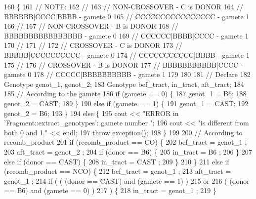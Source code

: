 \begin{DoxyCode}
160 \{
161     \textcolor{comment}{// NOTE: }
162     \textcolor{comment}{//}
163     \textcolor{comment}{// NON-CROSSOVER - C is DONOR}
164     \textcolor{comment}{// BBBBBB|CCCC|BBBB - gamete 0}
165     \textcolor{comment}{// CCCCCCCCCCCCCCCC - gamete 1}
166     \textcolor{comment}{//}
167     \textcolor{comment}{// NON-CROSSOVER - B is DONOR}
168     \textcolor{comment}{// BBBBBBBBBBBBBBBB - gamete 0}
169     \textcolor{comment}{// CCCCCC|BBBB|CCCC - gamete 1}
170     \textcolor{comment}{//}
171     \textcolor{comment}{//}
172     \textcolor{comment}{// CROSSOVER - C is DONOR}
173     \textcolor{comment}{// BBBBB|CCCCCCCCCC - gamete 0}
174     \textcolor{comment}{// CCCCCCCCCCC|BBBB - gamete 1}
175     \textcolor{comment}{//}
176     \textcolor{comment}{// CROSSOVER - B is DONOR}
177     \textcolor{comment}{// BBBBBBBBBBB|CCCC - gamete 0}
178     \textcolor{comment}{// CCCCC|BBBBBBBBBB - gamete 1}
179     
180     
181     \textcolor{comment}{// Declare}
182     Genotype genot\_1, genot\_2;
183     Genotype bef\_tract, in\_tract, aft\_tract;
184 
185     \textcolor{comment}{// According to the gamete}
186     \textcolor{keywordflow}{if} (gamete == 0) \{
187         genot\_1 = B6;
188         genot\_2 = CAST;
189     \}
190     \textcolor{keywordflow}{else} \textcolor{keywordflow}{if} (gamete == 1) \{
191         genot\_1 = CAST;
192         genot\_2 = B6;
193     \}
194     \textcolor{keywordflow}{else} \{
195         cout << \textcolor{stringliteral}{"ERROR in 'Fragment::extract\_genotypes': gamete number "};
196         cout << \textcolor{stringliteral}{"is different from both 0 and 1."} << endl;
197         \textcolor{keywordflow}{throw} exception();
198     \}
199     
200     \textcolor{comment}{// According to recomb\_product}
201     \textcolor{keywordflow}{if} (recomb\_product == CO) \{
202         bef\_tract = genot\_1 ;
203         aft\_tract = genot\_2 ;
204         \textcolor{keywordflow}{if} (donor == B6) \{
205             in\_tract = B6 ;
206         \}
207         \textcolor{keywordflow}{else} \textcolor{keywordflow}{if} (donor == CAST) \{
208             in\_tract = CAST ;
209         \}
210     \}
211     \textcolor{keywordflow}{else} \textcolor{keywordflow}{if} (recomb\_product == NCO) \{
212         bef\_tract = genot\_1 ;
213         aft\_tract = genot\_1 ;
214         \textcolor{keywordflow}{if} ( ( (donor == CAST) and (gamete == 1) )
215              or 
216              ( (donor == B6) and (gamete == 0) )
217            ) \{
218             in\_tract = genot\_1 ;
219         \}

\end{DoxyCode}
